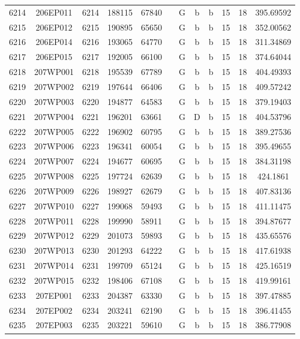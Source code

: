 \begin{tabular}{|*{12}{c|}}
6214 & 206EP011 & 6214 & 188115 & 67840 &  & G & b & b & 15 & 18 & 395.69592 \\ 
6215 & 206EP012 & 6215 & 190895 & 65650 &  & G & b & b & 15 & 18 & 352.00562 \\ 
6216 & 206EP014 & 6216 & 193065 & 64770 &  & G & b & b & 15 & 18 & 311.34869 \\ 
6217 & 206EP015 & 6217 & 192005 & 66100 &  & G & b & b & 15 & 18 & 374.64044 \\ 
6218 & 207WP001 & 6218 & 195539 & 67789 &  & G & b & b & 15 & 18 & 404.49393 \\ 
6219 & 207WP002 & 6219 & 197644 & 66406 &  & G & b & b & 15 & 18 & 409.57242 \\ 
6220 & 207WP003 & 6220 & 194877 & 64583 &  & G & b & b & 15 & 18 & 379.19403 \\ 
6221 & 207WP004 & 6221 & 196201 & 63661 &  & G & D & b & 15 & 18 & 404.53796 \\ 
6222 & 207WP005 & 6222 & 196902 & 60795 &  & G & b & b & 15 & 18 & 389.27536 \\ 
6223 & 207WP006 & 6223 & 196341 & 60054 &  & G & b & b & 15 & 18 & 395.49655 \\ 
6224 & 207WP007 & 6224 & 194677 & 60695 &  & G & b & b & 15 & 18 & 384.31198 \\ 
6225 & 207WP008 & 6225 & 197724 & 62639 &  & G & b & b & 15 & 18 & 424.1861 \\ 
6226 & 207WP009 & 6226 & 198927 & 62679 &  & G & b & b & 15 & 18 & 407.83136 \\ 
6227 & 207WP010 & 6227 & 199068 & 59493 &  & G & b & b & 15 & 18 & 411.11475 \\ 
6228 & 207WP011 & 6228 & 199990 & 58911 &  & G & b & b & 15 & 18 & 394.87677 \\ 
6229 & 207WP012 & 6229 & 201073 & 59893 &  & G & b & b & 15 & 18 & 435.65576 \\ 
6230 & 207WP013 & 6230 & 201293 & 64222 &  & G & b & b & 15 & 18 & 417.61938 \\ 
6231 & 207WP014 & 6231 & 199709 & 65124 &  & G & b & b & 15 & 18 & 425.16519 \\ 
6232 & 207WP015 & 6232 & 198406 & 67108 &  & G & b & b & 15 & 18 & 419.99161 \\ 
6233 & 207EP001 & 6233 & 204387 & 63330 &  & G & b & b & 15 & 18 & 397.47885 \\ 
6234 & 207EP002 & 6234 & 203241 & 62190 &  & G & b & b & 15 & 18 & 396.41455 \\ 
6235 & 207EP003 & 6235 & 203221 & 59610 &  & G & b & b & 15 & 18 & 386.77908 \\ 

\end{tabular}
